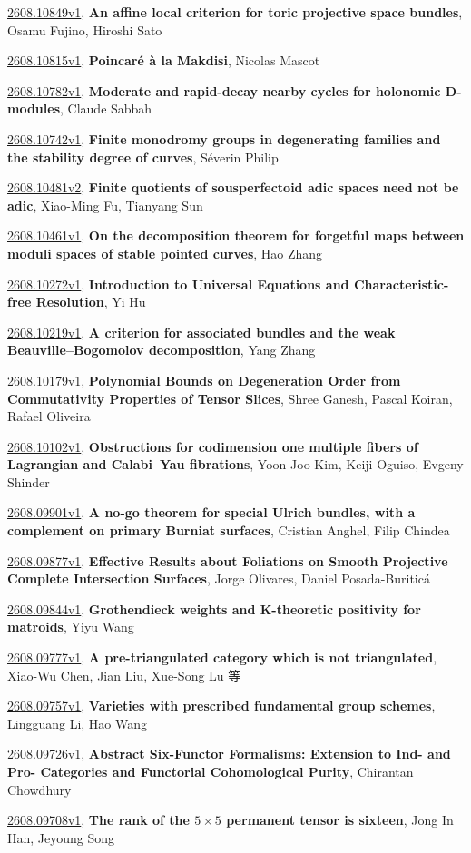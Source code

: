 \documentclass[9pt, a4paper]{article}
\theoremstyle{plain}
\theoremstyle{definition}
\theoremstyle{remark}
\newcommand{\arxiv}[3]{\href{https://arxiv.org/abs/#1}{#1}, \textbf{\textcolor{arxivblue}{#2}}, #3}
\begin{document}
\arxiv{2608.10849v1}{An affine local criterion for toric projective space bundles}{Osamu Fujino, Hiroshi Sato}

\arxiv{2608.10815v1}{Poincaré à la Makdisi}{Nicolas Mascot}

\arxiv{2608.10782v1}{Moderate and rapid-decay nearby cycles for holonomic D-modules}{Claude Sabbah}

\arxiv{2608.10742v1}{Finite monodromy groups in degenerating families and the stability degree of curves}{Séverin Philip}

\arxiv{2608.10481v2}{Finite quotients of sousperfectoid adic spaces need not be adic}{Xiao-Ming Fu, Tianyang Sun}

\arxiv{2608.10461v1}{On the decomposition theorem for forgetful maps between moduli spaces of stable pointed curves}{Hao Zhang}

\arxiv{2608.10272v1}{Introduction to Universal Equations and Characteristic-free Resolution}{Yi Hu}

\arxiv{2608.10219v1}{A criterion for associated bundles and the weak Beauville--Bogomolov decomposition}{Yang Zhang}

\arxiv{2608.10179v1}{Polynomial Bounds on Degeneration Order from Commutativity Properties of Tensor Slices}{Shree Ganesh, Pascal Koiran, Rafael Oliveira}

\arxiv{2608.10102v1}{Obstructions for codimension one multiple fibers of Lagrangian and Calabi--Yau fibrations}{Yoon-Joo Kim, Keiji Oguiso, Evgeny Shinder}

\arxiv{2608.09901v1}{A no-go theorem for special Ulrich bundles, with a complement on primary Burniat surfaces}{Cristian Anghel, Filip Chindea}

\arxiv{2608.09877v1}{Effective Results about Foliations on Smooth Projective Complete Intersection Surfaces}{Jorge Olivares, Daniel Posada-Buriticá}

\arxiv{2608.09844v1}{Grothendieck weights and K-theoretic positivity for matroids}{Yiyu Wang}

\arxiv{2608.09777v1}{A pre-triangulated category which is not triangulated}{Xiao-Wu Chen, Jian Liu, Xue-Song Lu 等}

\arxiv{2608.09757v1}{Varieties with prescribed fundamental group schemes}{Lingguang Li, Hao Wang}

\arxiv{2608.09726v1}{Abstract Six-Functor Formalisms: Extension to Ind- and Pro- Categories and Functorial Cohomological Purity}{Chirantan Chowdhury}

\arxiv{2608.09708v1}{The rank of the $5\times 5$ permanent tensor is sixteen}{Jong In Han, Jeyoung Song}
\end{document}
